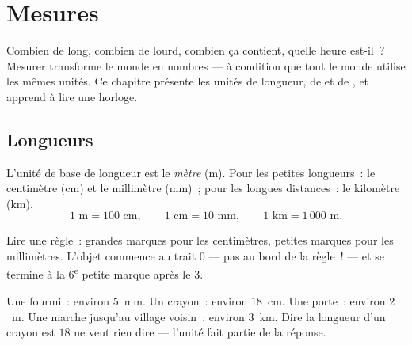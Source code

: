 \chapter{Mesures}\label{ch:g3:measure}

Combien de long, combien de lourd, combien ça contient, quelle
heure est-il~? Mesurer transforme le monde en nombres --- à
condition que tout le monde utilise les mêmes unités. Ce chapitre
présente les unités de longueur, de  et de , et
apprend à lire une horloge.

\section{Longueurs}

\begin{definition}\label{def:g3:measure:length}
L'unité de base de longueur est le \emph{mètre} (m). Pour les
petites longueurs~: le centimètre (cm) et le millimètre (mm)~;
pour les longues distances~: le kilomètre (km).
\[
1 \text{ m} = 100 \text{ cm}, \qquad
1 \text{ cm} = 10 \text{ mm}, \qquad
1 \text{ km} = 1\,000 \text{ m}.
\]
\end{definition}

\begin{omfigure}

{\small Lire une règle~: grandes marques pour les centimètres,
petites marques pour les millimètres. L'objet commence au trait
$0$ --- pas au bord de la règle~! --- et se termine à la
$6$\textsuperscript{e} petite marque après le $3$.}
\end{omfigure}

\begin{example}\label{ex:g3:measure:choose}
Une fourmi~: environ $5$~mm. Un crayon~: environ $18$~cm. Une
porte~: environ $2$~m. Une marche jusqu'au village voisin~: environ
$3$~km. Dire \guillemotleft{} la longueur d'un crayon est $18$
\guillemotright{} ne veut rien dire --- l'unité fait partie de la
réponse.
\end{example}

